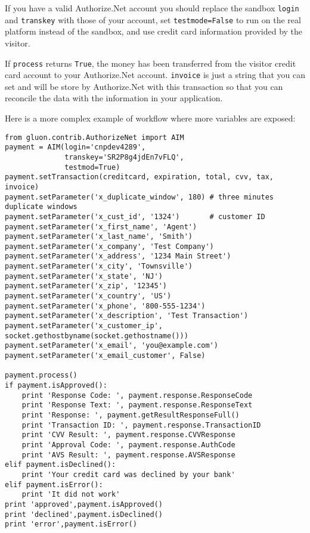 \documentclass[justified,sixbynine,notoc]{tufte-book}
\def\ft{\small\tt}
\begin{document}
\begin{fullwidth}
If you have a valid Authorize.Net account you should replace the sandbox {\ft login} and {\ft transkey} with those of your account, set {\ft testmode=False} to run on the real platform instead of the sandbox, and use credit card information provided by the visitor.

If {\ft process} returns {\ft True}, the money has been transferred from the visitor credit card account to your Authorize.Net account. {\ft invoice} is just a string that you can set and will be store by Authorize.Net with this transaction so that you can reconcile the data with the information in your application.

Here is a more complex example of workflow where more variables are exposed:
\begin{lstlisting}
from gluon.contrib.AuthorizeNet import AIM
payment = AIM(login='cnpdev4289',
              transkey='SR2P8g4jdEn7vFLQ',
              testmod=True)
payment.setTransaction(creditcard, expiration, total, cvv, tax, invoice)
payment.setParameter('x_duplicate_window', 180) # three minutes duplicate windows
payment.setParameter('x_cust_id', '1324')       # customer ID
payment.setParameter('x_first_name', 'Agent')
payment.setParameter('x_last_name', 'Smith')
payment.setParameter('x_company', 'Test Company')
payment.setParameter('x_address', '1234 Main Street')
payment.setParameter('x_city', 'Townsville')
payment.setParameter('x_state', 'NJ')
payment.setParameter('x_zip', '12345')
payment.setParameter('x_country', 'US')
payment.setParameter('x_phone', '800-555-1234')
payment.setParameter('x_description', 'Test Transaction')
payment.setParameter('x_customer_ip', socket.gethostbyname(socket.gethostname()))
payment.setParameter('x_email', 'you@example.com')
payment.setParameter('x_email_customer', False)

payment.process()
if payment.isApproved():
    print 'Response Code: ', payment.response.ResponseCode
    print 'Response Text: ', payment.response.ResponseText
    print 'Response: ', payment.getResultResponseFull()
    print 'Transaction ID: ', payment.response.TransactionID
    print 'CVV Result: ', payment.response.CVVResponse
    print 'Approval Code: ', payment.response.AuthCode
    print 'AVS Result: ', payment.response.AVSResponse
elif payment.isDeclined():
    print 'Your credit card was declined by your bank'
elif payment.isError():
    print 'It did not work'
print 'approved',payment.isApproved()
print 'declined',payment.isDeclined()
print 'error',payment.isError()
\end{lstlisting}


\end{fullwidth}
\end{document}
